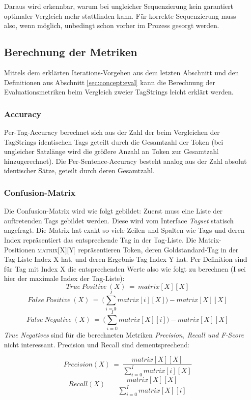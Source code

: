 Daraus wird erkennbar, warum bei ungleicher Sequenzierung kein garantiert optimaler Vergleich mehr stattfinden kann. Für korrekte Sequenzierung muss also, wenn möglich, unbedingt schon vorher im Prozess gesorgt werden.

\subsection{Berechnung der Metriken}
\label{sec:impl:eval:calc}

Mittels dem erklärten Iterations-Vorgehen aus dem letzten Abschnitt und den Definitionen aus Abschnitt \ref{sec:concept:eval} kann die Berechnung der Evaluationsmetriken beim Vergleich zweier TagStrings leicht erklärt werden.

\subsubsection{Accuracy}
Per-Tag-Accuracy berechnet sich aus der Zahl der beim Vergleichen der TagStrings identischen Tags geteilt durch die Gesamtzahl der Token (bei ungleicher Satzlänge wird die größere Anzahl an Token zur Gesamtzahl hinzugerechnet). Die Per-Sentence-Accuracy besteht analog aus der Zahl absolut identischer Sätze, geteilt durch deren Gesamtzahl.

\subsubsection{Confusion-Matrix}
Die Confusion-Matrix wird wie folgt gebildet: Zuerst muss eine Liste der auftretenden Tags gebildet werden. Diese wird vom Interface \textit{Tagset} statisch angefragt. Die Matrix hat exakt so viele Zeilen und Spalten wie Tags und deren Index repräsentiert das entsprechende Tag in der Tag-Liste. Die Matrix-Positionen \textsc{matrix[X][Y]} repräsentieren Token, deren Goldstandard-Tag in der Tag-Liste Index X hat, und deren Ergebnis-Tag Index Y hat. Per Definition sind für Tag mit Index X die entsprechenden Werte also wie folgt zu berechnen (\textsc{I} sei hier der maximale Index der Tag-Liste):
\[True\: Positive\:(X)\:=\: matrix[X][X]\]
\[False\: Positive\:(X)\:=\: \Bigg(\sum_{i=0}^I matrix[i][X]\Bigg) - matrix[X][X] \]
\[False\: Negative\:(X)\:=\: \Bigg(\sum_{i=0}^I matrix[X][i]\Bigg) - matrix[X][X] \]
\textit{True Negatives} sind für die berechneten Metriken \textit{Precision, Recall und F-Score} nicht interessant. Precision und Recall sind dementsprechend:

\[Precision(X) \:=\: \frac{matrix[X][X]}{\sum_{i=0}^I matrix[i][X]}\]
\[Recall(X) \:=\: \frac{matrix[X][X]}{\sum_{i=0}^I matrix[X][i]}\]
 
